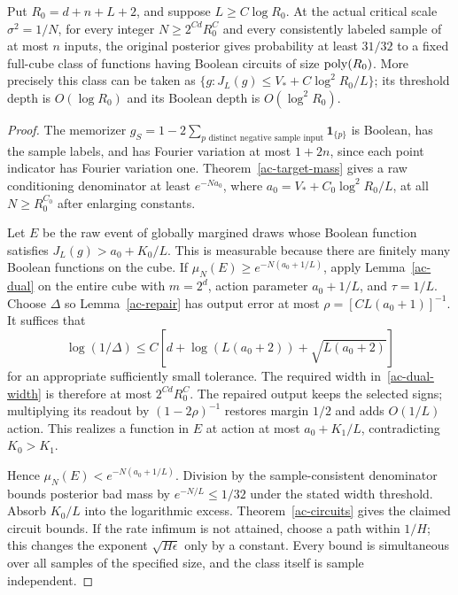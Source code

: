 \begin{theorem}\label{ac-ceiling}
Put $R_0=d+n+L+2$, and suppose $L\ge C\log R_0$. At the actual
critical scale $\sigma^2=1/N$, for every integer
$N\ge2^{Cd}R_0^C$ and every consistently labeled sample of at most
$n$ inputs, the original posterior gives probability at least
$31/32$ to a fixed full-cube class of functions having Boolean
circuits of size $\operatorname{poly}(R_0)$. More precisely this class can be taken
as $\{g:J_L(g)\le V_*+C\log^2R_0/L\}$; its threshold depth is
$O(\log R_0)$ and its Boolean depth is $O(\log^2R_0)$.
\end{theorem}
\begin{proof}
The memorizer $g_S=1-2\sum_{p\text{ distinct negative sample input}}
\boldsymbol1_{\{p\}}$ is Boolean, has the sample labels, and has
Fourier variation at most $1+2n$, since each point indicator has
Fourier variation one. Theorem~\ref{ac-target-mass} gives a raw
conditioning denominator at least $e^{-Na_0}$, where
$a_0=V_*+C_0\log^2R_0/L$, at all $N\ge R_0^{C_0}$ after
enlarging constants.

Let $E$ be the raw event of globally margined draws whose Boolean
function satisfies $J_L(g)>a_0+K_0/L$. This is measurable because
there are finitely many Boolean functions on the cube. If
$\mu_N(E)\ge e^{-N(a_0+1/L)}$, apply Lemma~\ref{ac-dual} on
the entire cube with $m=2^d$, action parameter $a_0+1/L$, and
$\tau=1/L$. Choose $\Delta$ so Lemma~\ref{ac-repair} has output
error at most $\rho=[C L(a_0+1)]^{-1}$. It suffices that
\[
 \log(1/\Delta)\le
 C[d+\log(L(a_0+2))+\sqrt{L(a_0+2)}]
\]
for an appropriate sufficiently small tolerance. The required width
in~\eqref{ac-dual-width} is therefore at most $2^{Cd}R_0^C$.
The repaired output keeps the selected signs; multiplying its readout
by $(1-2\rho)^{-1}$ restores margin $1/2$ and adds $O(1/L)$
action. This realizes a function in $E$ at action at most
$a_0+K_1/L$, contradicting $K_0>K_1$.

Hence $\mu_N(E)<e^{-N(a_0+1/L)}$. Division by the sample-consistent
denominator bounds posterior bad mass by $e^{-N/L}\le1/32$ under
the stated width threshold. Absorb $K_0/L$ into the logarithmic
excess. Theorem~\ref{ac-circuits} gives the claimed circuit bounds.
If the rate infimum is not attained, choose a path within $1/H$;
this changes the exponent $\sqrt{H\epsilon}$ only by a constant.
Every bound is simultaneous over all samples of the specified size,
and the class itself is sample independent.
\end{proof}
